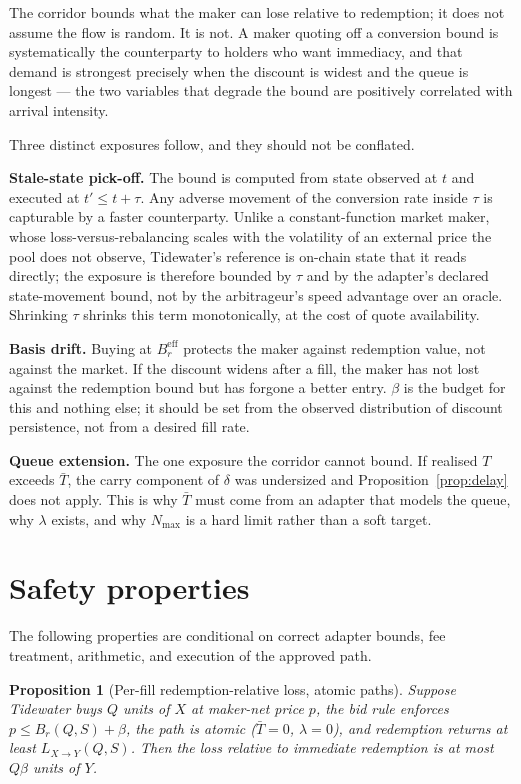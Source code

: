 \documentclass[10pt,twocolumn]{article}
\newtheorem{proposition}{Proposition}
\theoremstyle{definition}
\newcommand{\Lb}{L_{X\to Y}}
\newcommand{\Br}{B_{r}}
\newcommand{\Bre}{B_{r}^{\mathrm{eff}}}
\begin{document}
The corridor bounds what the maker can lose relative to redemption; it does not assume the flow is random. It is
not. A maker quoting off a conversion bound is systematically the counterparty to holders who want immediacy, and
that demand is strongest precisely when the discount is widest and the queue is longest --- the two variables that
degrade the bound are positively correlated with arrival intensity.

Three distinct exposures follow, and they should not be conflated.

\textbf{Stale-state pick-off.} The bound is computed from state observed at $t$ and executed at $t' \le t+\tau$.
Any adverse movement of the conversion rate inside $\tau$ is capturable by a faster counterparty. Unlike a
constant-function market maker, whose loss-versus-rebalancing scales with the volatility of an external price the
pool does not observe, Tidewater's reference is on-chain state that it reads directly; the exposure is therefore
bounded by $\tau$ and by the adapter's declared state-movement bound, not by the arbitrageur's speed advantage
over an oracle. Shrinking $\tau$ shrinks this term monotonically, at the cost of quote availability.

\textbf{Basis drift.} Buying at $\Bre$ protects the maker against redemption value, not against the market. If the
discount widens after a fill, the maker has not lost against the redemption bound but has forgone a better entry.
$\beta$ is the budget for this and nothing else; it should be set from the observed distribution of discount
persistence, not from a desired fill rate.

\textbf{Queue extension.} The one exposure the corridor cannot bound. If realised $T$ exceeds $\bar{T}$, the
carry component of $\delta$ was undersized and Proposition~\ref{prop:delay} does not apply. This is why $\bar T$
must come from an adapter that models the queue, why $\lambda$ exists, and why $N_{\max}$ is a hard limit rather
than a soft target.

\section{Safety properties}

The following properties are conditional on correct adapter bounds, fee treatment, arithmetic, and execution of
the approved path.

\begin{proposition}[Per-fill redemption-relative loss, atomic paths]
\label{prop:atomic}
Suppose Tidewater buys $Q$ units of $X$ at maker-net price $p$, the bid rule enforces $p \le \Br(Q,S)+\beta$, the
path is atomic ($\bar T = 0$, $\lambda=0$), and redemption returns at least $\Lb(Q,S)$. Then the loss relative to
immediate redemption is at most $Q\beta$ units of $Y$.
\end{proposition}
\end{document}
